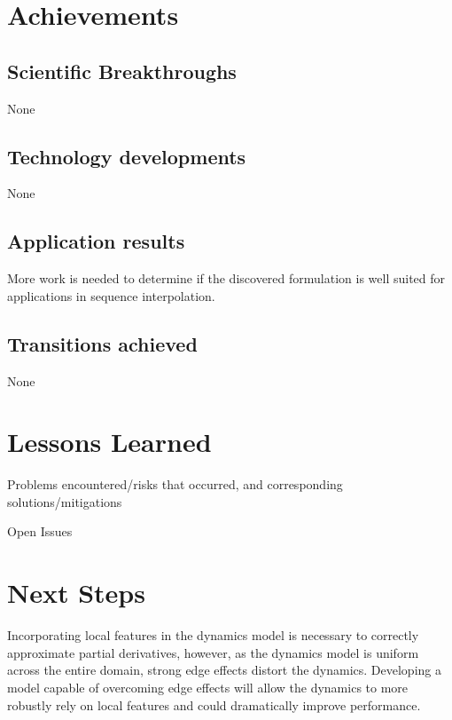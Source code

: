 \documentclass[12pt]{article}
\theoremstyle{plain}
\theoremstyle{remark}
\theoremstyle{definition}
\begin{document}
\section{Achievements}

\subsection{Scientific Breakthroughs}

None

\subsection{Technology developments}

None

\subsection{Application results}

More work is needed to determine if the discovered formulation is well suited for applications in sequence interpolation.

\subsection{Transitions achieved}

None

\section{Lessons Learned}

\noindent 

\noindent Problems encountered/risks that occurred, and corresponding solutions/mitigations

\noindent Open Issues

\section{Next Steps}

\noindent Incorporating local features in the dynamics model is necessary to correctly approximate partial derivatives, however, as the dynamics model is uniform across the entire domain, strong edge effects distort the dynamics. Developing a model capable of overcoming edge effects will allow the dynamics to more robustly rely on local features and could dramatically improve performance.
\end{document}

